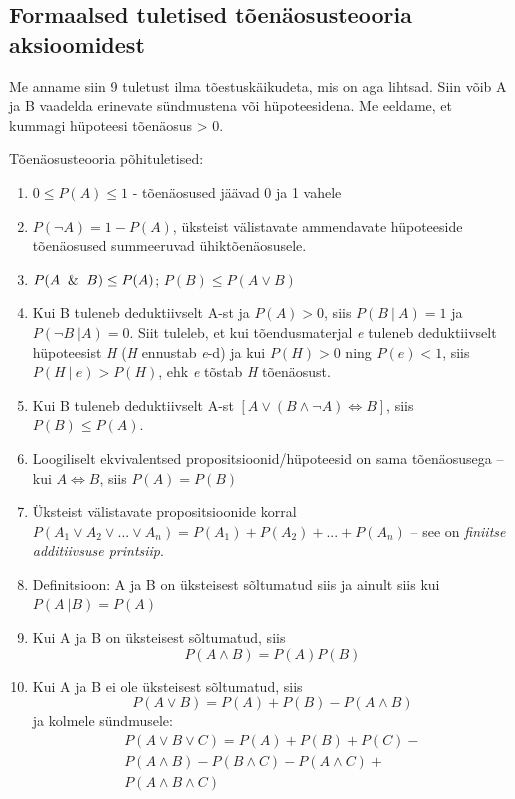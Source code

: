 \documentclass[]{book}
\begin{document}
\subsection*{Formaalsed tuletised tõenäosusteooria
aksioomidest}\label{formaalsed-tuletised-toenaosusteooria-aksioomidest}

Me anname siin 9 tuletust ilma tõestuskäikudeta, mis on aga lihtsad.
Siin võib A ja B vaadelda erinevate sündmustena või hüpoteesidena. Me
eeldame, et kummagi hüpoteesi tõenäosus \textgreater{} 0.

Tõenäosusteooria põhituletised:

\begin{enumerate}
\def\labelenumi{\arabic{enumi}.}
\setcounter{enumi}{4}
\item
  \(0 \leq P(A) \leq 1\) - tõenäosused jäävad 0 ja 1 vahele
\item
  \(P(\lnot A) = 1 - P(A)\), üksteist välistavate ammendavate
  hüpoteeside tõenäosused summeeruvad ühiktõenäosusele.
\item
  \(P(A \And B) \le P(A)\); \(P(B) \leq P(A \lor B)\)
\item
  Kui B tuleneb deduktiivselt A-st ja \(P(A) > 0\), siis
  \(P(B~ \vert ~A) = 1\) ja \(P(\lnot B~ \vert A) = 0\). Siit tuleleb,
  et kui tõendusmaterjal \emph{e} tuleneb deduktiivselt hüpoteesist
  \emph{H} (\emph{H} ennustab \emph{e}-d) ja kui \(P(H) > 0\) ning
  \(P(e) < 1\), siis \(P(H~ \lvert~ e) > P(H)\), ehk \emph{e} tõstab
  \emph{H} tõenäosust.
\item
  Kui B tuleneb deduktiivselt A-st
  \([A \lor (B \land \lnot A) \Leftrightarrow B]\), siis
  \(P(B) \leq P(A)\).
\item
  Loogiliselt ekvivalentsed propositsioonid/hüpoteesid on sama
  tõenäosusega -- kui \(A \Leftrightarrow B\), siis \(P(A) = P(B)\)
\item
  Üksteist välistavate propositsioonide korral
  \(P(A_1 \lor A_2 \lor ... \lor A_n) = P(A_1) + P(A_2) + ... + P(A_n)\)
  -- see on \emph{finiitse additiivsuse printsiip}.
\item
  Definitsioon: A ja B on üksteisest sõltumatud siis ja ainult siis kui
  \(P(A~ \vert B) = P(A)\)
\item
  Kui A ja B on üksteisest sõltumatud, siis \[P(A\land B) = P(A)P(B)\]
\item
  Kui A ja B ei ole üksteisest sõltumatud, siis
  \[P(A \lor B) = P(A) + P(B) - P(A \land B)\] ja kolmele sündmusele:
  \[\begin{array}{lcl} P(A \lor B \lor C) = P(A) + P(B) + P(C) - \\P(A \land B) - P(B \land C) - P(A \land C) + \\P(A \land B \land C) \end{array}\]

\end{enumerate}
\end{document}
